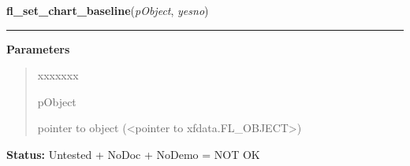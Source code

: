 \hspace{.8\funcindent}\begin{boxedminipage}{\funcwidth}

    \raggedright \textbf{fl\_set\_chart\_baseline}(\textit{pObject}, \textit{yesno})

    \vspace{-1.5ex}

    \rule{\textwidth}{0.5\fboxrule}
\setlength{\parskip}{2ex}
\setlength{\parskip}{1ex}
      \textbf{Parameters}
      \vspace{-1ex}

      \begin{quote}
        \begin{Ventry}{xxxxxxx}

          \item[pObject]

          pointer to object ({\textless}pointer to 
          xfdata.FL\_OBJECT{\textgreater})

        \end{Ventry}

      \end{quote}

\textbf{Status:} Untested + NoDoc + NoDemo = NOT OK



    \end{boxedminipage}

    \label{xformslib:library:fl_set_chart_lcolor}

    \vspace{0.5ex}

